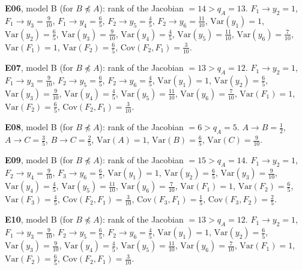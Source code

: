 \documentclass[10pt,a4paper]{article}
\newcommand{\nnest}{\not\preceq}
\begin{document}
{\small
\noindent\textbf{E06}, model B (for $B\nnest A$): rank of the Jacobian $=14>q_A=13$. {\footnotesize $F_{1}\to y_{2}=1$, $F_{1}\to y_{3}=\tfrac{9}{10}$, $F_{1}\to y_{4}=\tfrac{6}{5}$, $F_{2}\to y_{5}=\tfrac{4}{5}$, $F_{2}\to y_{6}=\tfrac{11}{10}$, $\mathrm{Var}(y_{1})=1$, $\mathrm{Var}(y_{2})=\tfrac{6}{5}$, $\mathrm{Var}(y_{3})=\tfrac{9}{10}$, $\mathrm{Var}(y_{4})=\tfrac{4}{5}$, $\mathrm{Var}(y_{5})=\tfrac{11}{10}$, $\mathrm{Var}(y_{6})=\tfrac{7}{10}$, $\mathrm{Var}(F_{1})=1$, $\mathrm{Var}(F_{2})=\tfrac{6}{5}$, $\mathrm{Cov}(F_{2},F_{1})=\tfrac{3}{10}$.}\par\smallskip
\noindent\textbf{E07}, model B (for $B\nnest A$): rank of the Jacobian $=13>q_A=12$. {\footnotesize $F_{1}\to y_{2}=1$, $F_{1}\to y_{3}=\tfrac{9}{10}$, $F_{2}\to y_{5}=\tfrac{6}{5}$, $F_{2}\to y_{6}=\tfrac{4}{5}$, $\mathrm{Var}(y_{1})=1$, $\mathrm{Var}(y_{2})=\tfrac{6}{5}$, $\mathrm{Var}(y_{3})=\tfrac{9}{10}$, $\mathrm{Var}(y_{4})=\tfrac{4}{5}$, $\mathrm{Var}(y_{5})=\tfrac{11}{10}$, $\mathrm{Var}(y_{6})=\tfrac{7}{10}$, $\mathrm{Var}(F_{1})=1$, $\mathrm{Var}(F_{2})=\tfrac{6}{5}$, $\mathrm{Cov}(F_{2},F_{1})=\tfrac{3}{10}$.}\par\smallskip
\noindent\textbf{E08}, model B (for $B\nnest A$): rank of the Jacobian $=6>q_A=5$. {\footnotesize $A\to B=\tfrac{1}{2}$, $A\to C=\tfrac{3}{5}$, $B\to C=\tfrac{2}{5}$, $\mathrm{Var}(A)=1$, $\mathrm{Var}(B)=\tfrac{6}{5}$, $\mathrm{Var}(C)=\tfrac{9}{10}$.}\par\smallskip
\noindent\textbf{E09}, model B (for $B\nnest A$): rank of the Jacobian $=15>q_A=14$. {\footnotesize $F_{1}\to y_{2}=1$, $F_{2}\to y_{4}=\tfrac{9}{10}$, $F_{3}\to y_{6}=\tfrac{6}{5}$, $\mathrm{Var}(y_{1})=1$, $\mathrm{Var}(y_{2})=\tfrac{6}{5}$, $\mathrm{Var}(y_{3})=\tfrac{9}{10}$, $\mathrm{Var}(y_{4})=\tfrac{4}{5}$, $\mathrm{Var}(y_{5})=\tfrac{11}{10}$, $\mathrm{Var}(y_{6})=\tfrac{7}{10}$, $\mathrm{Var}(F_{1})=1$, $\mathrm{Var}(F_{2})=\tfrac{6}{5}$, $\mathrm{Var}(F_{3})=\tfrac{4}{5}$, $\mathrm{Cov}(F_{2},F_{1})=\tfrac{3}{10}$, $\mathrm{Cov}(F_{3},F_{1})=\tfrac{1}{5}$, $\mathrm{Cov}(F_{3},F_{2})=\tfrac{2}{5}$.}\par\smallskip
\noindent\textbf{E10}, model B (for $B\nnest A$): rank of the Jacobian $=13>q_A=12$. {\footnotesize $F_{1}\to y_{2}=1$, $F_{1}\to y_{3}=\tfrac{9}{10}$, $F_{2}\to y_{5}=\tfrac{6}{5}$, $F_{2}\to y_{6}=\tfrac{4}{5}$, $\mathrm{Var}(y_{1})=1$, $\mathrm{Var}(y_{2})=\tfrac{6}{5}$, $\mathrm{Var}(y_{3})=\tfrac{9}{10}$, $\mathrm{Var}(y_{4})=\tfrac{4}{5}$, $\mathrm{Var}(y_{5})=\tfrac{11}{10}$, $\mathrm{Var}(y_{6})=\tfrac{7}{10}$, $\mathrm{Var}(F_{1})=1$, $\mathrm{Var}(F_{2})=\tfrac{6}{5}$, $\mathrm{Cov}(F_{2},F_{1})=\tfrac{3}{10}$.}\par\smallskip
}
\end{document}
